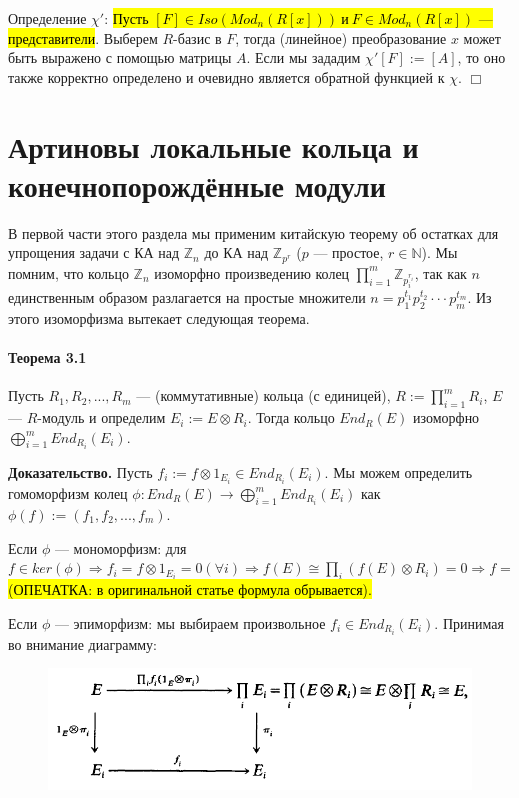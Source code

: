 \documentclass[a4paper,12pt]{article}
\begin{document}
Определение $\chi'$: \hl{Пусть $[F] \in Iso(Mod_n(R[x])) ~ и ~ F \in Mod_n(R[x])$ --- представители}. Выберем $R$-базис в $F$, тогда (линейное) преобразование $x$ может быть выражено с помощью матрицы $A$. Если мы зададим $\chi'[F] := [A]$, то оно также корректно определено и очевидно является обратной функцией к $\chi$.  $\Box$

\section{Артиновы локальные кольца и конечнопорождённые модули}

В первой части этого раздела мы применим китайскую теорему об остатках для упрощения задачи с КА над $\mathbb{Z}_{n}$ до КА над $\mathbb{Z}_{p^r}$ ($p$ --- простое, $r \in \mathbb{N}$).
Мы помним, что кольцо $\mathbb{Z}_{n}$ изоморфно произведению колец $\prod_{i=1}^{m} { {\mathbb{Z}}_{{p_{i}^{r_{i}}}}}$, так как $n$ единственным образом разлагается на простые множители $n = p_1^{t_1} p_2^{t_2} \cdot \cdot \cdot p_m^{t_m}$. Из этого изоморфизма вытекает следующая теорема. 

\paragraph{Теорема 3.1}

Пусть $R_1, R_2, ..., R_m$ --- (коммутативные) кольца (с единицей), $R:=\prod_{i=1}^{m}R_i$, $E$ --- $R$-модуль и определим $E_i := E \otimes R_i$. Тогда кольцо $End_R(E)$ изоморфно $\bigoplus_{i=1}^{m}End_{R_i}(E_i)$.

\textbf{Доказательство.}
Пусть $f_i := f\otimes1_{E_i} \in End_{R_i}(E_i)$. Мы можем определить гомоморфизм колец $\phi : End_R(E) \rightarrow \bigoplus_{i=1}^{m} End_{R_i} (E_i)$ как $\phi(f) := (f_1, f_2, ..., f_m)$. 

Если $\phi$ --- мономорфизм: для $f \in ker(\phi) \Rightarrow f_i = f \otimes 1_{E_i} = 0 (\forall i) \Rightarrow f(E) \cong \prod_{i}(f(E) \otimes R_i) = 0 \Rightarrow f = $ \hl{(ОПЕЧАТКА: в оригинальной статье формула обрывается).}

Если $\phi$ --- эпиморфизм: мы выбираем произвольное $f_i \in End_{R_i} (E_i)$. Принимая во внимание диаграмму:

\begin{figure}[h]
	\centering
	\includegraphics[width=0.5\linewidth]{pictures/diag_2.png}
\end{figure}
\end{document}
